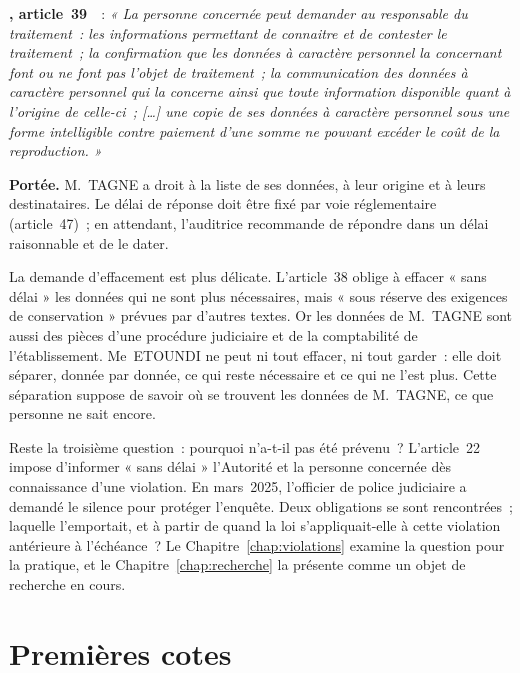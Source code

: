\begin{boxjuris}
\textbf{, article~39}~\cite{loi2024017}~:
\textit{« La personne concernée peut demander au responsable du
traitement~: les informations permettant de connaitre et de contester le
traitement~; la confirmation que les données à caractère personnel la
concernant font ou ne font pas l'objet de traitement~; la communication des
données à caractère personnel qui la concerne ainsi que toute information
disponible quant à l'origine de celle-ci~; [\ldots] une copie de ses données
à caractère personnel sous une forme intelligible contre paiement d'une
somme ne pouvant excéder le coût de la reproduction. »}

\smallskip
\textbf{Portée.} M.~TAGNE a droit à la liste de ses données, à leur origine
et à leurs destinataires. Le délai de réponse doit être fixé par voie
réglementaire (article~47)~; en attendant, l'auditrice recommande de
répondre dans un délai raisonnable et de le dater.
\end{boxjuris}

La demande d'effacement est plus délicate. L'article~38 oblige à effacer
« sans délai » les données qui ne sont plus nécessaires, mais « sous réserve
des exigences de conservation » prévues par d'autres textes. Or les données
de M.~TAGNE sont aussi des pièces d'une procédure judiciaire et de la
comptabilité de l'établissement. Me~ETOUNDI ne peut ni tout effacer, ni tout
garder~: elle doit séparer, donnée par donnée, ce qui reste nécessaire et ce
qui ne l'est plus. Cette séparation suppose de savoir où se trouvent les
données de M.~TAGNE, ce que personne ne sait encore.

Reste la troisième question~: pourquoi n'a-t-il pas été prévenu~? L'article~22
impose d'informer « sans délai » l'Autorité et la personne concernée dès
connaissance d'une violation. En mars~2025, l'officier de police judiciaire
a demandé le silence pour protéger l'enquête. Deux obligations se sont
rencontrées~; laquelle l'emportait, et à partir de quand la loi
s'appliquait-elle à cette violation antérieure à l'échéance~? Le
Chapitre~\ref{chap:violations} examine la question pour la pratique, et le
Chapitre~\ref{chap:recherche} la présente comme un objet de recherche en
cours.

\section{Premières cotes}
\label{sec:p00-cotes}

